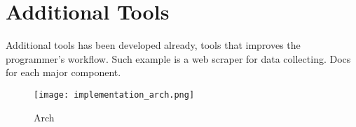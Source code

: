 


  \section*{Additional Tools}

    Additional tools has been developed already, tools that improves the programmer's workflow.
    Such example is a web scraper for data collecting.
    Docs for each major component.
    \begin{figure}
      \begin{center}
        \texttt{[image: implementation\_arch.png]}
      \caption{Arch}
      \end{center}
    \end{figure}
